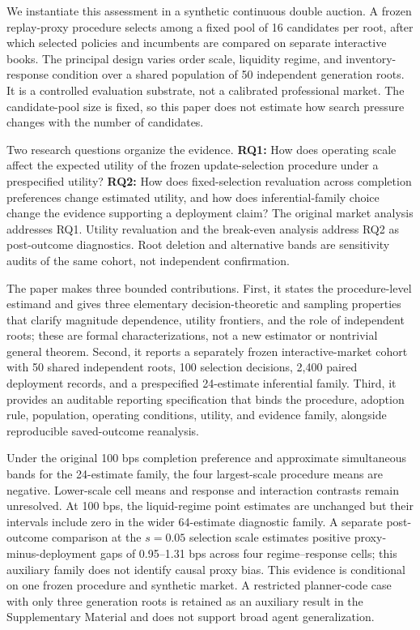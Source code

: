\documentclass[10pt,letterpaper]{article}
\begin{document}
We instantiate this assessment in a synthetic continuous double auction. A frozen replay-proxy procedure selects among a fixed pool of 16 candidates per root, after which selected policies and incumbents are compared on separate interactive books. The principal design varies order scale, liquidity regime, and inventory-response condition over a shared population of 50 independent generation roots. It is a controlled evaluation substrate, not a calibrated professional market. The candidate-pool size is fixed, so this paper does not estimate how search pressure changes with the number of candidates.

Two research questions organize the evidence. \textbf{RQ1:} How does operating scale affect the expected utility of the frozen update-selection procedure under a prespecified utility? \textbf{RQ2:} How does fixed-selection revaluation across completion preferences change estimated utility, and how does inferential-family choice change the evidence supporting a deployment claim? The original market analysis addresses RQ1. Utility revaluation and the break-even analysis address RQ2 as post-outcome diagnostics. Root deletion and alternative bands are sensitivity audits of the same cohort, not independent confirmation.

The paper makes three bounded contributions. First, it states the procedure-level estimand and gives three elementary decision-theoretic and sampling properties that clarify magnitude dependence, utility frontiers, and the role of independent roots; these are formal characterizations, not a new estimator or nontrivial general theorem. Second, it reports a separately frozen interactive-market cohort with 50 shared independent roots, 100 selection decisions, 2,400 paired deployment records, and a prespecified 24-estimate inferential family. Third, it provides an auditable reporting specification that binds the procedure, adoption rule, population, operating conditions, utility, and evidence family, alongside reproducible saved-outcome reanalysis.

Under the original 100 bps completion preference and approximate simultaneous bands for the 24-estimate family, the four largest-scale procedure means are negative. Lower-scale cell means and response and interaction contrasts remain unresolved. At 100 bps, the liquid-regime point estimates are unchanged but their intervals include zero in the wider 64-estimate diagnostic family. A separate post-outcome comparison at the $s=0.05$ selection scale estimates positive proxy-minus-deployment gaps of 0.95--1.31 bps across four regime--response cells; this auxiliary family does not identify causal proxy bias. This evidence is conditional on one frozen procedure and synthetic market. A restricted planner-code case with only three generation roots is retained as an auxiliary result in the Supplementary Material and does not support broad agent generalization.
\end{document}
